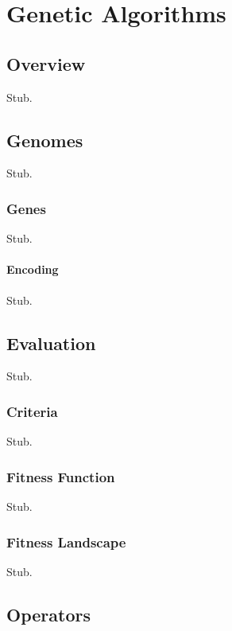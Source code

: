 \chapter{Genetic Algorithms}

\label{Chapter2}

\section{Overview}

Stub.

\section{Genomes}

Stub.

\subsection{Genes}

Stub.

\subsubsection{Encoding}

Stub.

\section{Evaluation}

Stub.

\subsection{Criteria}

Stub.

\subsection{Fitness Function}

Stub.

\subsection{Fitness Landscape}

Stub.

\section{Operators}

